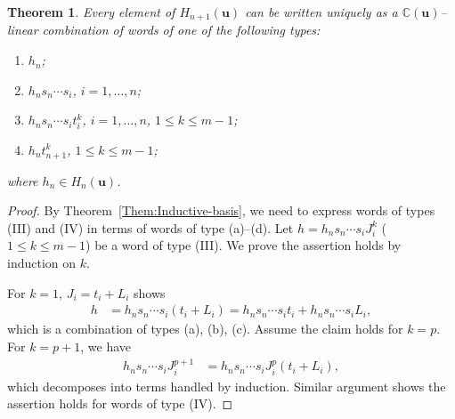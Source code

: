 \documentclass[a4paper, oneside]{amsart}
\numberwithin{equation}{section}
\newtheorem{theorem}[equation]{Theorem}
\theoremstyle{definition}
\theoremstyle{remark}
\begin{document}
\begin{theorem}\label{Them:Basis-for-Markov}
Every element of \(H_{n+1}(\boldsymbol{u})\) can be written uniquely as a $\mathbb{C}(\boldsymbol{u})$--linear combination of words of one of the following types:
\begin{enumerate}
  \item[(a)] \(h_{n}\);
  \item[(b)] \(h_{n}s_n \cdots s_i\), $i = 1, \ldots, n$;
  \item[(c)] \(h_{n}s_n \cdots s_i t_{i}^k\), $i = 1, \ldots, n$, \(1 \leq k\leq m-1\);
  \item[(d)] \(h_{n}t_{n+1}^k\), \(1 \leq k \leq m-1\);
\end{enumerate}
where \(h_{n} \in H_n(\boldsymbol{u})\).
\end{theorem}
\begin{proof}
By Theorem~\ref{Them:Inductive-basis}, we need to express words of types (III) and (IV) in terms of words of type (a)--(d). Let \(h = h_{n}s_n \cdots s_i J_i^k\) (\(1 \leq k\leq m-1\)) be a word of type (III). We prove the assertion holds  by induction on $k$.

For $k = 1$, $J_i=t_i+L_i$ shows
\begin{align*}
 h &= h_{n}s_n \cdots s_i(t_i + L_i) = h_{n}s_n \cdots s_i t_i + h_{n}s_n \cdots s_i L_i,
\end{align*}
which is a combination of types (a), (b), (c). Assume the claim holds for $k = p$. For $k = p+1$, we have
\begin{align*}
  h_{n}s_n \cdots s_i J_i^{p+1}& = h_{n}s_n \cdots s_i J_i^p (t_i + L_i),
\end{align*}
which decomposes into terms handled by induction. Similar argument shows the assertion holds  for words of type (IV).
\end{proof}
\end{document}
